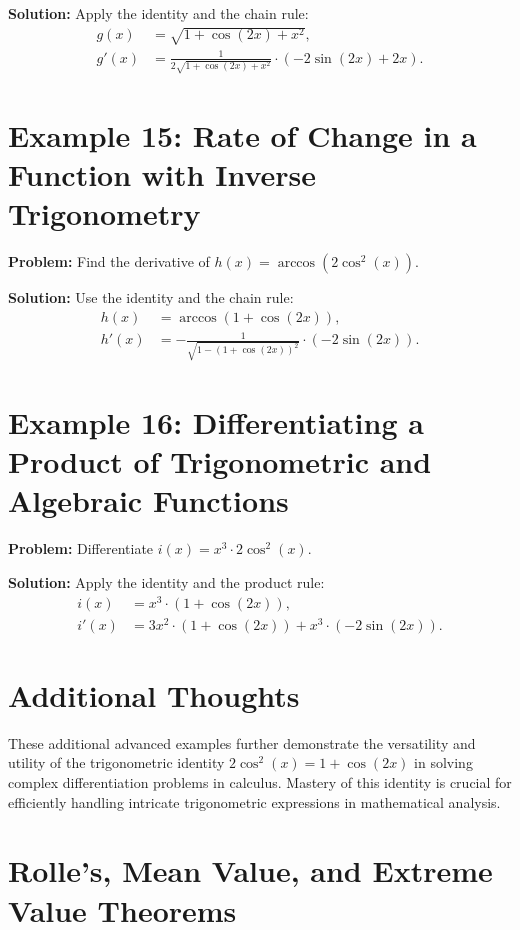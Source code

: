 \documentclass[a4paper,12pt]{book}
\newcounter{problem}
\newcounter{example}
\begin{document}
\textbf{Solution:}
Apply the identity and the chain rule:
\begin{align*}
g(x) &= \sqrt{1 + \cos(2x) + x^2}, \\
g'(x) &= \frac{1}{2\sqrt{1 + \cos(2x) + x^2}} \cdot (-2 \sin(2x) + 2x).
\end{align*}

\section*{Example 15: Rate of Change in a Function with Inverse Trigonometry}
\textbf{Problem:} Find the derivative of \(h(x) = \arccos(2 \cos^2(x))\).

\textbf{Solution:}
Use the identity and the chain rule:
\begin{align*}
h(x) &= \arccos(1 + \cos(2x)), \\
h'(x) &= -\frac{1}{\sqrt{1 - (1 + \cos(2x))^2}} \cdot (-2 \sin(2x)).
\end{align*}

\section*{Example 16: Differentiating a Product of Trigonometric and Algebraic Functions}
\textbf{Problem:} Differentiate \(i(x) = x^3 \cdot 2 \cos^2(x)\).

\textbf{Solution:}
Apply the identity and the product rule:
\begin{align*}
i(x) &= x^3 \cdot (1 + \cos(2x)), \\
i'(x) &= 3x^2 \cdot (1 + \cos(2x)) + x^3 \cdot (-2 \sin(2x)).
\end{align*}

\section*{Additional Thoughts}
These additional advanced examples further demonstrate the versatility and utility of the trigonometric identity \(2 \cos^2(x) = 1 + \cos(2x)\) in solving complex differentiation problems in calculus. Mastery of this identity is crucial for efficiently handling intricate trigonometric expressions in mathematical analysis.







\section{Rolle's, Mean Value, and Extreme Value Theorems}
\end{document}
